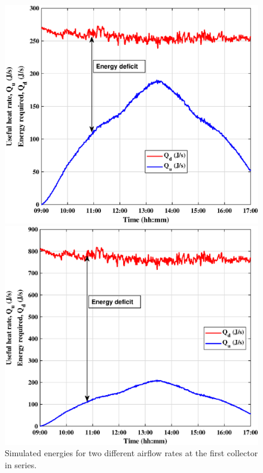 \begin{figure}[ht!]
	\begin{minipage}{0.50\columnwidth}
		\includegraphics[scale=0.45]{figs/dry_low_1col.eps}
		
	\end{minipage}
	\begin{minipage}{0.50\columnwidth}
		\includegraphics[scale=0.45]{figs/dry_high_1col.eps}
		
	\end{minipage}
	\caption{Simulated energies for two different airflow rates at the first collector in series.}
	\label{dry_1col}
\end{figure}

